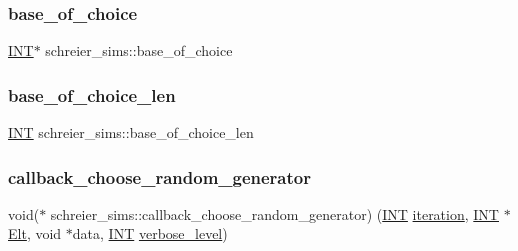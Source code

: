 \subsubsection{\texorpdfstring{base\+\_\+of\+\_\+choice}{base\_of\_choice}}
{\footnotesize\ttfamily \mbox{\hyperlink{galois_8h_a09fddde158a3a20bd2dcadb609de11dc}{I\+NT}}$\ast$ schreier\+\_\+sims\+::base\+\_\+of\+\_\+choice}

\mbox{\label{classschreier__sims_a12707cc1e744ca9f9f78e6b0b37f55cb}} 
\subsubsection{\texorpdfstring{base\+\_\+of\+\_\+choice\+\_\+len}{base\_of\_choice\_len}}
{\footnotesize\ttfamily \mbox{\hyperlink{galois_8h_a09fddde158a3a20bd2dcadb609de11dc}{I\+NT}} schreier\+\_\+sims\+::base\+\_\+of\+\_\+choice\+\_\+len}

\mbox{\label{classschreier__sims_a31b141e23452438d7db65f104ca8e1ee}} 
\subsubsection{\texorpdfstring{callback\+\_\+choose\+\_\+random\+\_\+generator}{callback\_choose\_random\_generator}}
{\footnotesize\ttfamily void($\ast$ schreier\+\_\+sims\+::callback\+\_\+choose\+\_\+random\+\_\+generator) (\mbox{\hyperlink{galois_8h_a09fddde158a3a20bd2dcadb609de11dc}{I\+NT}} \mbox{\hyperlink{classschreier__sims_a11b719a35db207e78f21da7c98d67d18}{iteration}}, \mbox{\hyperlink{galois_8h_a09fddde158a3a20bd2dcadb609de11dc}{I\+NT}} $\ast$\mbox{\hyperlink{simeon_8_c_aec1406935bdb1fee3561fcb840964100}{Elt}}, void $\ast$data, \mbox{\hyperlink{galois_8h_a09fddde158a3a20bd2dcadb609de11dc}{I\+NT}} \mbox{\hyperlink{simeon_8_c_a818073fbcc2f439e7c56952f67386122}{verbose\+\_\+level}})}

\mbox{\label{classschreier__sims_ac50eb5360fae2c322a7e4b2af83389b1}} 
